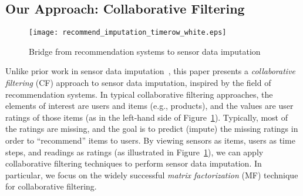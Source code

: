 

\subsection{Our Approach: Collaborative Filtering}

\vspace{-0.5cm}

\begin{figure}[h]
\centering

\texttt{[image: recommend\_imputation\_timerow\_white.eps]}
\vspace{-0.1in}
\caption{Bridge from recommendation systems to sensor data imputation} 
\label{recommend_imputation}
\vspace{-0.1in}
\end{figure}

Unlike prior work in sensor data imputation~\cite{Granger:lastseen, le2005estimating, 
Gruenwald:FARM, li2008data, yuan2000multiple, Jian-Zhong:STI, pan2010k,
osborne2012real, beckers2003eof, kondrashov2006spatio}, this paper presents a {\em collaborative filtering} (CF) 
approach to sensor data imputation, inspired by the field of recommendation
systems.  In typical collaborative filtering approaches, the elements of interest are users
and items (e.g., products), and the values are user ratings of those
items (as in the left-hand side of
Figure~\ref{recommend_imputation}).  Typically, most of the ratings
are missing, and the goal is to predict (impute) the missing ratings
in order to ``recommend'' items to users.  By viewing sensors as
items, users as time steps, and readings as ratings (as illustrated in
Figure~\ref{recommend_imputation}), we can apply collaborative filtering
techniques to perform sensor data imputation. 
In particular, we focus on the
widely successful {\em matrix factorization} (MF) technique for collaborative filtering.

